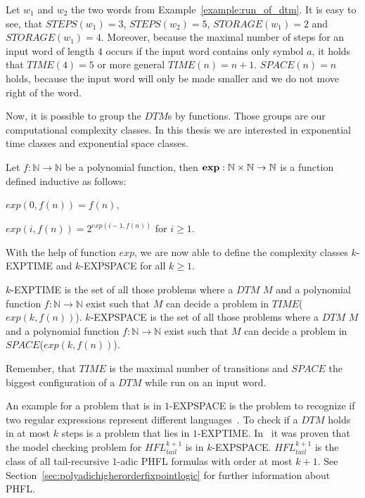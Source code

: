 \begin{example}
    \label{example:time_and_space}
    Let $w_1$ and $w_2$ the two words from Example~\ref{example:run_of_dtm}. It is easy to see, that $\mathit{STEPS}
    (w_1) = 3$, $\mathit{STEPS}(w_2) = 5$, $\mathit{STORAGE}(w_1) = 2$ and $\mathit{STORAGE}(w_1) = 4$. Moreover,
    because the maximal number of steps for an input word of length $4$ occurs if the input word contains only symbol
    $a$, it holds that $\mathit{TIME}(4) = 5$ or more general $\mathit{TIME}(n) = n + 1$. $\mathit{SPACE}(n) = n$
    holds, because the input word will only be made smaller and we do not move right of the word.
\end{example}

Now, it is possible to group the $\mathit{DTM}$s by functions. Those groups are our computational complexity classes.
In this thesis we are interested in exponential time classes and exponential space classes.

\begin{definition}
    Let $f: \mathbb{N} \rightarrow \mathbb{N}$ be a polynomial function, then $\emph{exp}: \mathbb{N} \times \mathbb{N}
    \rightarrow \mathbb{N}$ is a function defined inductive as follows:
    \begin{compactitem}
        \item $exp(0, f(n)) = f(n)$,
        \item $exp(i, f(n)) = 2^{exp(i - 1, f(n))}$ for $i \geq 1$.
    \end{compactitem}
\end{definition}

With the help of function $exp$, we are now able to define the complexity classes $k$-EXPTIME and $k$-EXPSPACE for
all $k \geq 1$.

\begin{definition}
    \label{definition:k_exptime_and_k_expspace}
    $k$-EXPTIME is the set of all those problems where a $\mathit{DTM}$ $M$ and a polynomial function $f: \mathbb{N}
    \rightarrow \mathbb{N}$ exist such that $M$ can decide a problem in $\mathit{TIME}$($exp(k, f(n))$).
    $k$-EXPSPACE is the set of all those problems where a $\mathit{DTM}$ $M$ and a polynomial function $f: \mathbb{N}
    \rightarrow \mathbb{N}$ exist such that $M$ can decide a problem in $\mathit{SPACE}$($exp(k, f(n))$).
\end{definition}

Remember, that $\mathit{TIME}$ is the maximal number of transitions and $\mathit{SPACE}$ the biggest configuration of a
$\mathit{DTM}$ while run on an input word.

An example for a problem that is in $1$-EXPSPACE is the problem to recognize
if two regular expressions represent different languages~\cite{meyer1972equivalence}. To check if a $\mathit{DTM}$
holds in at most $k$ steps is a problem that lies in $1$-EXPTIME. In~\cite{bruse2017space} it was proven that the
model checking problem for $\mathit{HFL}^{k + 1}_{tail}$ is in $k$-EXPSPACE. $\mathit{HFL}^{k + 1}_{tail}$ is the
class of all tail-recursive $1$-adic PHFL formulas with order at most $k + 1$. See
Section~\ref{sec:polyadichigherorderfixpointlogic} for further information about PHFL.